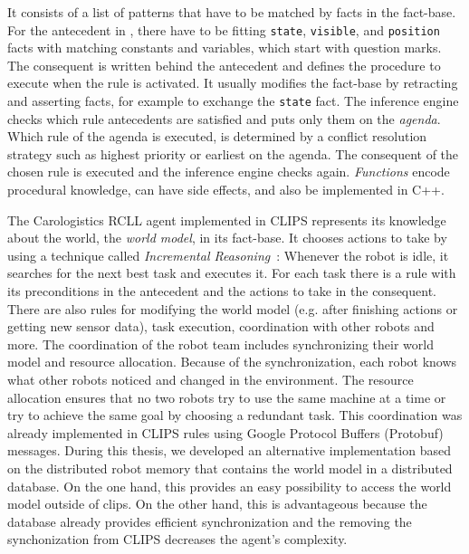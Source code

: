 It consists of a list of patterns that have to be matched by facts in
the fact-base. For the antecedent in , there
have to be fitting \texttt{state}, \texttt{visible}, and
\texttt{position} facts with matching constants and variables, which
start with question marks. The consequent is written behind the
antecedent and defines the procedure to execute when the rule is
activated. It usually modifies the fact-base by retracting and
asserting facts, for example to exchange the \texttt{state} fact. The
inference engine checks which rule antecedents are satisfied and puts
only them on the \emph{agenda}. Which rule of the agenda is executed,
is determined by a conflict resolution strategy such as highest
priority or earliest on the agenda. The consequent of the chosen rule
is executed and the inference engine checks again. \emph{Functions}
encode procedural knowledge, can have side effects, and also be
implemented in C++.

The Carologistics RCLL agent implemented in CLIPS represents its
knowledge about the world, the \emph{world model}, in its
fact-base. It chooses actions to take by using a technique called
\emph{Incremental Reasoning}~\cite{CLIPS-Agent}: Whenever the robot is
idle, it searches for the next best task and executes it.  For each
task there is a rule with its preconditions in the antecedent and the
actions to take in the consequent. There are also rules for modifying
the world model (e.g. after finishing actions or getting new sensor
data), task execution, coordination with other robots and more.  The
coordination of the robot team includes synchronizing their world
model and resource allocation. Because of the synchronization, each
robot knows what other robots noticed and changed in the
environment. The resource allocation ensures that no two robots try to
use the same machine at a time or try to achieve the same goal by
choosing a redundant task. This coordination was already implemented
in CLIPS rules using Google Protocol Buffers (Protobuf)
messages. During this thesis, we developed an alternative
implementation based on the distributed robot memory that contains the
world model in a distributed database. On the one hand, this provides
an easy possibility to access the world model outside of clips. On the
other hand, this is advantageous
because the database already provides efficient synchronization and
the removing the synchonization from CLIPS decreases the
agent's complexity.


